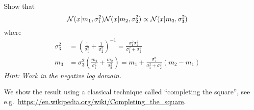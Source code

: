\begin{exenumerate}
\item Show that
  \begin{equation}
    \mathcal{N}(x | m_1, \sigma_1^2) \mathcal{N}(x | m_2, \sigma_2^2) \propto \mathcal{N}(x | m_3, \sigma_3^2) \label{eq:Gaussian-mult}
  \end{equation}
  where
  \begin{align}
    \sigma^2_3 & = \left( \frac{1}{\sigma_1^2} + \frac{1}{\sigma_2^2}\right)^{-1} = \frac{\sigma_1^2 \sigma_2^2}{\sigma_1^2+\sigma_2^2}\\
    m_3 & = \sigma_3^2\left( \frac{m_1}{\sigma_1^2}+ \frac{m_2}{\sigma_2^2}\right) = m_1 + \frac{\sigma_1^2}{\sigma_1^2+\sigma_2^2}(m_2-m_1)
  \end{align}
  \emph{Hint: Work in the negative log domain.}
  
  \begin{solution}
    We show the result using a classical technique called ``completing the square'', see e.g.\ \url{https://en.wikipedia.org/wiki/Completing_the_square}.


\end{solution}
\end{exenumerate}
